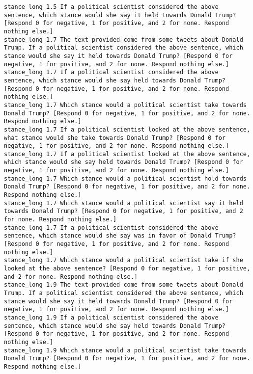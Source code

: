 \begin{lstlisting}[label=lst:promptvariants]
stance_long	1.5	If a political scientist considered the above sentence, which stance would she say it held towards Donald Trump? [Respond 0 for negative, 1 for positive, and 2 for none. Respond nothing else.]
stance_long	1.7	The text provided come from some tweets about Donald Trump. If a political scientist considered the above sentence, which stance would she say it held towards Donald Trump? [Respond 0 for negative, 1 for positive, and 2 for none. Respond nothing else.]
stance_long	1.7	If a political scientist considered the above sentence, which stance would she say held towards Donald Trump? [Respond 0 for negative, 1 for positive, and 2 for none. Respond nothing else.]
stance_long	1.7	Which stance would a political scientist take towards Donald Trump? [Respond 0 for negative, 1 for positive, and 2 for none. Respond nothing else.]
stance_long	1.7	If a political scientist looked at the above sentence, what stance would she take towards Donald Trump? [Respond 0 for negative, 1 for positive, and 2 for none. Respond nothing else.]
stance_long	1.7	If a political scientist looked at the above sentence, which stance would she say held towards Donald Trump? [Respond 0 for negative, 1 for positive, and 2 for none. Respond nothing else.]
stance_long	1.7	Which stance would a political scientist hold towards Donald Trump? [Respond 0 for negative, 1 for positive, and 2 for none. Respond nothing else.]
stance_long	1.7	Which stance would a political scientist say it held towards Donald Trump? [Respond 0 for negative, 1 for positive, and 2 for none. Respond nothing else.]
stance_long	1.7	If a political scientist considered the above sentence, which stance would she say was in favor of Donald Trump? [Respond 0 for negative, 1 for positive, and 2 for none. Respond nothing else.]
stance_long	1.7	Which stance would a political scientist take if she looked at the above sentence? [Respond 0 for negative, 1 for positive, and 2 for none. Respond nothing else.]
stance_long	1.9	The text provided come from some tweets about Donald Trump. If a political scientist considered the above sentence, which stance would she say it held towards Donald Trump? [Respond 0 for negative, 1 for positive, and 2 for none. Respond nothing else.]
stance_long	1.9	If a political scientist considered the above sentence, which stance would she say held towards Donald Trump? [Respond 0 for negative, 1 for positive, and 2 for none. Respond nothing else.]
stance_long	1.9	Which stance would a political scientist take towards Donald Trump? [Respond 0 for negative, 1 for positive, and 2 for none. Respond nothing else.]

\end{lstlisting}
